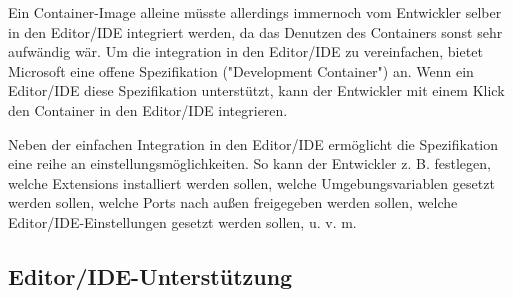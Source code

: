 Ein Container-Image alleine müsste allerdings immernoch vom Entwickler selber in den Editor/IDE integriert werden, da das Denutzen des Containers sonst sehr aufwändig wär. Um die integration in den Editor/IDE zu vereinfachen, bietet Microsoft eine offene Spezifikation ("Development Container") an. Wenn ein Editor/IDE diese Spezifikation unterstützt, kann der Entwickler mit einem Klick den Container in den Editor/IDE integrieren.

Neben der einfachen Integration in den Editor/IDE ermöglicht die Spezifikation eine reihe an einstellungsmöglichkeiten. So kann der Entwickler z. B. festlegen, welche Extensions installiert werden sollen, welche Umgebungsvariablen gesetzt werden sollen, welche Ports nach außen freigegeben werden sollen, welche Editor/IDE-Einstellungen gesetzt werden sollen, u. v. m.


\subsection{Editor/IDE-Unterstützung}

